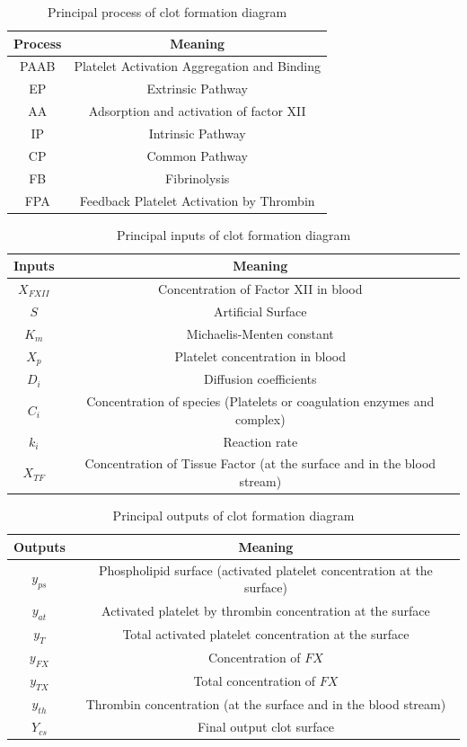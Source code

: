 \documentclass[%
 nofootinbib,
 amsmath,amssymb,
 aps,
 pra,
]{revtex4-1}
\begin{document}
\begin{table}[h]
\begin{tabular}{c c}
\hline
Process & Meaning   \\
\hline
PAAB & Platelet Activation Aggregation and Binding \\
EP & Extrinsic Pathway \\
AA & Adsorption and activation of factor XII \\ 
IP & Intrinsic Pathway \\
CP & Common Pathway \\
FB & Fibrinolysis \\ 
FPA & Feedback Platelet Activation by Thrombin \\
\hline
\end{tabular}
\caption{\label{tab:process} Principal process of clot formation diagram }
\end{table}
\begin{table}[h]
\begin{tabular}{c c}
\hline
Inputs & Meaning   \\
\hline
$X_{FXII}$ & Concentration of Factor XII in blood \\
$S$ & Artificial Surface \\
$K_{m}$ & Michaelis-Menten constant \\
$X_{p}$ & Platelet concentration in blood \\
$D_{i}$ & Diffusion coefficients \\
$C_{i}$ & Concentration of species (Platelets or coagulation enzymes and complex) \\
$k_{i}$ & Reaction rate \\
$X_{TF}$ & Concentration of Tissue Factor (at the surface and in the blood stream) \\
\hline
\end{tabular}
\caption{\label{tab:process} Principal inputs of clot formation diagram}
\end{table}
\begin{table}[h]
\begin{tabular}{c c}
\hline
Outputs & Meaning   \\
\hline
$y_{ps}$ & Phospholipid surface (activated platelet concentration at the surface) \\
$y_{at}$ & Activated platelet by thrombin concentration at the surface \\
$y_T$ & Total activated platelet concentration at the surface \\
$y_{FX}$ & Concentration of $FX$ \\
$y_{TX}$ & Total concentration of $FX$ \\
$y_{th}$ & Thrombin concentration (at the surface and in the blood stream) \\
$Y_{cs}$ & Final output clot surface \\
\hline
\end{tabular}
\caption{\label{tab:process} Principal outputs of clot formation diagram}
\end{table}
\end{document}
